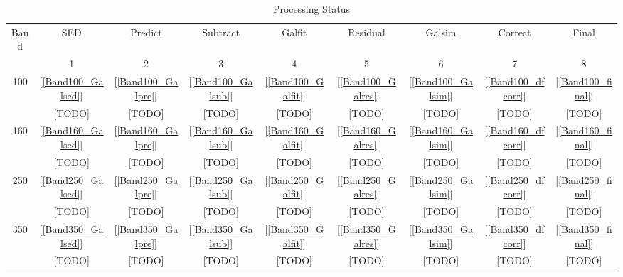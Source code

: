 \documentclass[11pt,a4paper]{article}
\begin{document}
\begin{table}[h]
	\caption{Processing Status}
	\begin{tabular}{ccccccccc}
		\hline
		\hline
		Band & SED & Predict & Subtract & Galfit & Residual & Galsim & Correct & Final \\
		& 1 & 2 & 3 & 4 & 5 & 6 & 7 & 8 \\
		\hline
		100 & [\ref{Band100_Galsed}] & [\ref{Band100_Galpre}] & [\ref{Band100_Galsub}] & [\ref{Band100_Galfit}] & [\ref{Band100_Galres}] & [\ref{Band100_Galsim}] & [\ref{Band100_dfcorr}] & [\ref{Band100_final}] \\
		& \textcolor{red!50!black}{[TODO]} & \textcolor{red!50!black}{[TODO]} & \textcolor{red!50!black}{[TODO]} & \textcolor{red!50!black}{[TODO]} & \textcolor{red!50!black}{[TODO]} & \textcolor{red!50!black}{[TODO]} & \textcolor{red!50!black}{[TODO]} & \textcolor{red!50!black}{[TODO]} \\
		160 & [\ref{Band160_Galsed}] & [\ref{Band160_Galpre}] & [\ref{Band160_Galsub}] & [\ref{Band160_Galfit}] & [\ref{Band160_Galres}] & [\ref{Band160_Galsim}] & [\ref{Band160_dfcorr}] & [\ref{Band160_final}] \\
		& \textcolor{red!50!black}{[TODO]} & \textcolor{red!50!black}{[TODO]} & \textcolor{red!50!black}{[TODO]} & \textcolor{red!50!black}{[TODO]} & \textcolor{red!50!black}{[TODO]} & \textcolor{red!50!black}{[TODO]} & \textcolor{red!50!black}{[TODO]} & \textcolor{red!50!black}{[TODO]} \\
		250 & [\ref{Band250_Galsed}] & [\ref{Band250_Galpre}] & [\ref{Band250_Galsub}] & [\ref{Band250_Galfit}] & [\ref{Band250_Galres}] & [\ref{Band250_Galsim}] & [\ref{Band250_dfcorr}] & [\ref{Band250_final}] \\
		& \textcolor{red!50!black}{[TODO]} & \textcolor{red!50!black}{[TODO]} & \textcolor{red!50!black}{[TODO]} & \textcolor{red!50!black}{[TODO]} & \textcolor{red!50!black}{[TODO]} & \textcolor{red!50!black}{[TODO]} & \textcolor{red!50!black}{[TODO]} & \textcolor{red!50!black}{[TODO]} \\
		350 & [\ref{Band350_Galsed}] & [\ref{Band350_Galpre}] & [\ref{Band350_Galsub}] & [\ref{Band350_Galfit}] & [\ref{Band350_Galres}] & [\ref{Band350_Galsim}] & [\ref{Band350_dfcorr}] & [\ref{Band350_final}] \\
		& \textcolor{red!50!black}{[TODO]} & \textcolor{red!50!black}{[TODO]} & \textcolor{red!50!black}{[TODO]} & \textcolor{red!50!black}{[TODO]} & \textcolor{red!50!black}{[TODO]} & \textcolor{red!50!black}{[TODO]} & \textcolor{red!50!black}{[TODO]} & \textcolor{red!50!black}{[TODO]} \\

\end{tabular}
\end{table}
\end{document}
